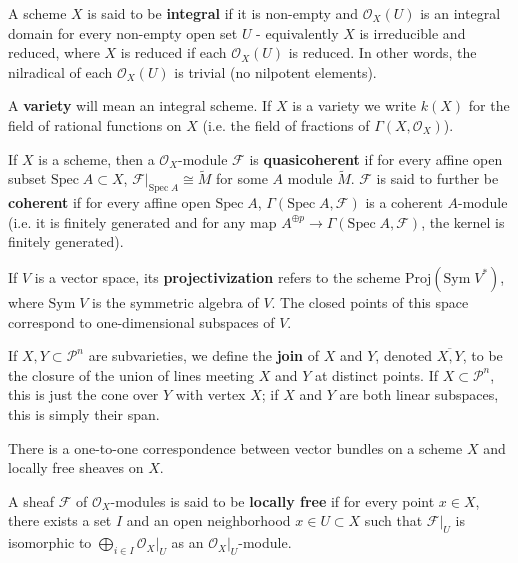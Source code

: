 \begin{definition}
    A scheme $X$ is said to be \textbf{integral} if it is non-empty and $\mathcal{O}_X(U)$ is an integral domain for every non-empty open set $U$ - equivalently $X$ is irreducible and reduced, where $X$ is reduced if each $\mathcal{O}_X(U)$ is reduced. In other words, the nilradical of each $\mathcal{O}_X(U)$ is trivial (no nilpotent elements).
\end{definition}

A \textbf{variety} will mean an integral scheme. If $X$ is a variety we write $k(X)$ for the field of rational functions on $X$ (i.e. the field of fractions of $\Gamma(X,\mathcal{O}_X)$).

\begin{definition}
    If $X$ is a scheme, then a $\mathcal{O}_X$-module $\mathcal{F}$ is \textbf{quasicoherent} if for every affine open subset $\text{Spec}\;A\subset X$, $\mathcal{F}\vert_{\text{Spec}\;A} \cong \widetilde{M}$ for some $A$ module $\widetilde{M}$. $\mathcal{F}$ is said to further be \textbf{coherent} if for every affine open $\text{Spec}\;A$, $\Gamma(\text{Spec}\;A,\mathcal{F})$ is a coherent $A$-module (i.e. it is finitely generated and for any map $A^{\oplus p}\rightarrow \Gamma(\text{Spec}\;A,\mathcal{F})$, the kernel is finitely generated).
\end{definition}

\begin{definition}
    If $V$ is a vector space, its \textbf{projectivization} refers to the scheme $\text{Proj}(\text{Sym}\;V^*)$, where $\text{Sym}\;V$ is the symmetric algebra of $V$. The closed points of this space correspond to one-dimensional subspaces of $V$.
\end{definition}

If $X,Y \subset \mathcal{P}^n$ are subvarieties, we define the \textbf{join} of $X$ and $Y$, denoted $\overline{X,Y}$, to be the closure of the union of lines meeting $X$ and $Y$ at distinct points. If $X \subset \mathcal{P}^n$, this is just the cone over $Y$ with vertex $X$; if $X$ and $Y$ are both linear subspaces, this is simply their span.

\begin{remark}
    There is a one-to-one correspondence between vector bundles on a scheme $X$ and locally free sheaves on $X$.
\end{remark}

\begin{definition}
    A sheaf $\mathcal{F}$ of $\mathcal{O}_X$-modules is said to be \textbf{locally free} if for every point $x \in X$, there exists a set $I$ and an open neighborhood $x \in U \subset X$ such that $\mathcal{F}\vert_U$ is isomorphic to $\bigoplus_{i \in I}\mathcal{O}_X\vert_U$ as an $\mathcal{O}_X\vert_U$-module.
\end{definition}


